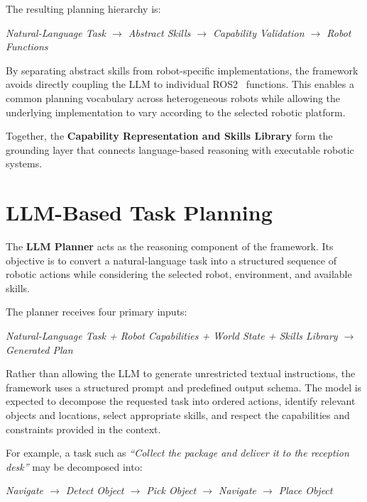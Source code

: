 \documentclass[12pt,a4paper]{article}
\begin{document}
The resulting planning hierarchy is:

\begin{center}
\textit{Natural-Language Task $\rightarrow$ Abstract Skills $\rightarrow$ Capability Validation $\rightarrow$ Robot Functions}
\end{center}

By separating abstract skills from robot-specific implementations, the framework avoids directly coupling the LLM to individual ROS2~\cite{ros2} functions.
This enables a common planning vocabulary across heterogeneous robots while allowing the underlying implementation to vary according to the selected robotic platform.

Together, the \textbf{Capability Representation and Skills Library} form the grounding layer that connects language-based reasoning with executable robotic systems.

\section{LLM-Based Task Planning}

The \textbf{LLM Planner} acts as the reasoning component of the framework.
Its objective is to convert a natural-language task into a structured sequence of robotic actions while considering the selected robot, environment, and available skills.

The planner receives four primary inputs:

\begin{center}
\textit{Natural-Language Task + Robot Capabilities + World State + Skills Library $\rightarrow$ Generated Plan}
\end{center}

Rather than allowing the LLM to generate unrestricted textual instructions, the framework uses a structured prompt and predefined output schema.
The model is expected to decompose the requested task into ordered actions, identify relevant objects and locations, select appropriate skills, and respect the capabilities and constraints provided in the context.

For example, a task such as \textit{``Collect the package and deliver it to the reception desk''} may be decomposed into:

\begin{center}
\textit{Navigate $\rightarrow$ Detect Object $\rightarrow$ Pick Object $\rightarrow$ Navigate $\rightarrow$ Place Object}
\end{center}
\end{document}
